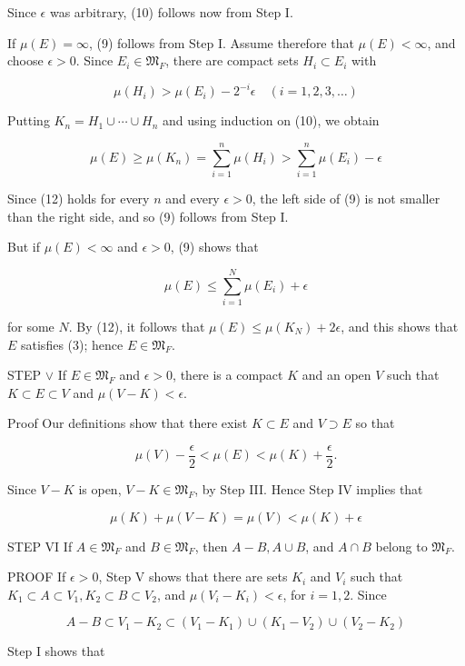 \documentclass[10pt]{article}
\begin{document}
Since $\epsilon$ was arbitrary, (10) follows now from Step I.

If $\mu(E)=\infty$, (9) follows from Step I. Assume therefore that $\mu(E)<\infty$, and choose $\epsilon>0$. Since $E_{i} \in \mathfrak{M}_{F}$, there are compact sets $H_{i} \subset E_{i}$ with

$$
\mu\left(H_{i}\right)>\mu\left(E_{i}\right)-2^{-i} \epsilon \quad(i=1,2,3, \ldots)
$$

Putting $K_{n}=H_{1} \cup \cdots \cup H_{n}$ and using induction on (10), we obtain

$$
\mu(E) \geq \mu\left(K_{n}\right)=\sum_{i=1}^{n} \mu\left(H_{i}\right)>\sum_{i=1}^{n} \mu\left(E_{i}\right)-\epsilon
$$

Since (12) holds for every $n$ and every $\epsilon>0$, the left side of (9) is not smaller than the right side, and so (9) follows from Step I.

But if $\mu(E)<\infty$ and $\epsilon>0$, (9) shows that

$$
\mu(E) \leq \sum_{i=1}^{N} \mu\left(E_{i}\right)+\epsilon
$$

for some $N$. By (12), it follows that $\mu(E) \leq \mu\left(K_{N}\right)+2 \epsilon$, and this shows that $E$ satisfies (3); hence $E \in \mathfrak{M}_{F}$.

STEP $\vee$ If $E \in \mathfrak{M}_{F}$ and $\epsilon>0$, there is a compact $K$ and an open $V$ such that $K \subset E \subset V$ and $\mu(V-K)<\epsilon$.

Proof Our definitions show that there exist $K \subset E$ and $V \supset E$ so that

$$
\mu(V)-\frac{\epsilon}{2}<\mu(E)<\mu(K)+\frac{\epsilon}{2} .
$$

Since $V-K$ is open, $V-K \in \mathfrak{M}_{F}$, by Step III. Hence Step IV implies that

$$
\mu(K)+\mu(V-K)=\mu(V)<\mu(K)+\epsilon
$$

STEP VI If $A \in \mathfrak{M}_{F}$ and $B \in \mathfrak{M}_{F}$, then $A-B, A \cup B$, and $A \cap B$ belong to $\mathfrak{M}_{F}$.

PROOF If $\epsilon>0$, Step $\mathrm{V}$ shows that there are sets $K_{i}$ and $V_{i}$ such that $K_{1} \subset A \subset V_{1}, K_{2} \subset B \subset V_{2}$, and $\mu\left(V_{i}-K_{i}\right)<\epsilon$, for $i=1,2$. Since

$$
A-B \subset V_{1}-K_{2} \subset\left(V_{1}-K_{1}\right) \cup\left(K_{1}-V_{2}\right) \cup\left(V_{2}-K_{2}\right)
$$

Step I shows that
\end{document}
